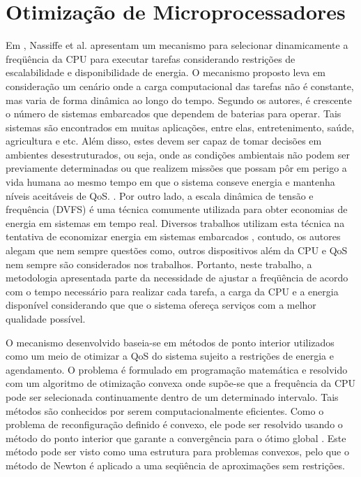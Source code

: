 \section{Otimização de Microprocessadores}

Em \cite{nassiffe2016optimising}, Nassiffe et al. apresentam um mecanismo para selecionar dinamicamente a freqüência da CPU para executar tarefas considerando restrições de escalabilidade e disponibilidade de energia. O mecanismo proposto leva em consideração um cenário onde a carga computacional das tarefas não é constante, mas varia de forma dinâmica ao longo do tempo.  Segundo os autores, é crescente o número de sistemas embarcados que dependem de baterias para operar. Tais sistemas são encontrados em muitas aplicações, entre elas, entretenimento, saúde, agricultura e etc. Além disso, estes devem ser capaz de tomar decisões em ambientes desestruturados, ou seja, onde as condições ambientais não podem ser previamente determinadas ou que realizem missões que possam pôr em perigo a vida humana ao mesmo tempo em que o sistema conseve energia e mantenha níveis aceitáveis de QoS. \cite{nassiffe2016optimising,raibert2008bigdog}. 
Por outro lado, a escala dinâmica de tensão e frequência (DVFS) é uma técnica comumente utilizada para obter economias de energia em sistemas em tempo real. Diversos trabalhos utilizam esta técnica na tentativa de economizar energia em sistemas embarcados \cite{saha2012experimental,snowdon2005power,zhu2004effects,aydin2006system}, contudo, os autores alegam que nem sempre questões como, outros dispositivos além da CPU e QoS nem sempre são considerados nos trabalhos. Portanto, neste trabalho, a metodologia apresentada parte da necessidade de ajustar a freqüência de acordo com o tempo necessário para realizar cada tarefa, a carga da CPU e a energia disponível considerando que que o sistema ofereça serviços com a melhor qualidade possível.

O mecanismo desenvolvido baseia-se em métodos de ponto interior utilizados como um meio de otimizar a QoS do sistema sujeito a restrições de energia e agendamento. O problema é formulado em programação matemática e resolvido com um algoritmo de otimização convexa onde supõe-se que a frequência da CPU pode ser selecionada continuamente dentro de um determinado intervalo. Tais métodos são conhecidos por serem computacionalmente eficientes. Como o problema de reconfiguração definido é convexo, ele pode ser resolvido usando o método do ponto interior que garante a convergência para o ótimo global \cite{boyd2004convex}. Este método pode ser visto como uma estrutura para problemas convexos, pelo que o método de Newton é aplicado a uma seqüência de aproximações sem restrições. 

